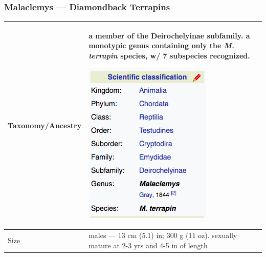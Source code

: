 \subsubsection{Malaclemys --- Diamondback Terrapins}
\begin{center}
\begin{longtabu} to 

	\hline
	Taxonomy/Ancestry &
	a member of the Deirochelyinae subfamily. a monotypic genus containing only the \emph{M. terrapin} species, w/ 7 subspecies recognized.
	
	\begin{center} \includegraphics[scale=0.5]{testudines/emydidae/malaclemys/tax} \end{center}
	 \\
	\hline
	Size & 
	males --- 13 cm (5.1) in; 300 g (11 oz). sexually mature at 2-3 yrs and 4-5 in of length
	

\end{longtabu}
\end{center}
